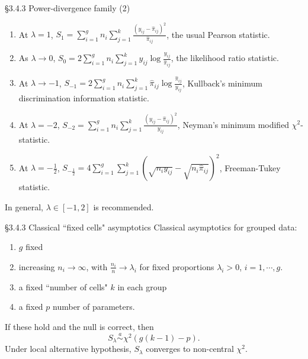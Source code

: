 \documentclass{beamer}
\begin{document}
\begin{frame}{\S3.4.3 Power-divergence family (2)}
\begin{enumerate}
\item
At $\lambda=1$, $\displaystyle S_1=\sum_{i=1}^g n_i\sum_{j=1}^k \frac{(y_{ij}-\hat{\pi}_{ij})^2}{\hat{\pi}_{ij}}$,
the usual Pearson statistic.
\item
As $\lambda\rightarrow 0$, $\displaystyle S_0=2\sum_{i=1}^g n_i\sum_{j=1}^k y_{ij}
\log \frac{y_{ij}}{\hat{\pi}_{ij}}$,
the likelihood ratio statistic.
\item
At $\lambda\rightarrow -1$, $\displaystyle S_{-1}=2\sum_{i=1}^g n_i\sum_{j=1}^k \hat{\pi}_{ij}
\log \frac{\hat{\pi}_{ij}}{y_{ij}}$, Kullback's minimum discrimination information statistic.
\item
At $\lambda= -2$, 
$\displaystyle S_{-2}=\sum_{i=1}^g n_i\sum_{j=1}^k \frac{(y_{ij}-\hat{\pi}_{ij})^2}{y_{ij}}$,
Neyman's minimum modified $\chi^2$-statistic.
\item
At $\lambda=-\frac{1}{2}$, $\displaystyle S_{-\frac{1}{2}}\!=\!4\!\sum_{i=1}^g \sum_{j=1}^k 
(\!\sqrt{n_iy_{ij}}-\sqrt{n_i\hat{\pi}_{ij}})^2$, {\small Freeman-Tukey statistic.}
\end{enumerate}
In general, $\lambda\in [-1, 2]$ is recommended.
\end{frame}

\begin{frame}{\large \S3.4.3 Classical ``fixed cells" asymptotics}
Classical asymptotics for grouped data:
\begin{enumerate}
\item
$g$  fixed
\item
increasing  $n_i\rightarrow\infty$, with $\frac{n_i}{n}\rightarrow\lambda_i$
for fixed proportions $\lambda_i>0$, $i=1,\cdots,g$.
\item
a fixed ``number of cells" $k$ in each group
\item
a fixed  $p$ number of parameters.
\end{enumerate}
If these hold and the null is correct, then
$$S_\lambda \stackrel{a}{\sim} \chi^2 (g(k-1)-p). $$
Under local alternative hypothesis,  $S_\lambda$ converges to non-central $\chi^2$.
\end{frame}
\end{document}
